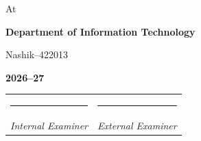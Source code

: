 \begin{center}
\vspace{0.10in}

{\large At\par}

\vspace{0.06in}

{\large\bfseries
Department of Information Technology\par
}

\vspace{0.02in}

{\Large\bfseries
\college\par
}

\vspace{0.02in}

{\large
Nashik--422013\par
}

\vspace{0.04in}

{\large\bfseries
2026--27\par
}

\vspace{0.40in}

\noindent
\begin{tabularx}{\textwidth}{
    >{\centering\arraybackslash}X
    >{\centering\arraybackslash}X
}

\rule{2.2in}{0.4pt} &
\rule{2.2in}{0.4pt}
\\[4pt]

\large\itshape Internal Examiner &
\large\itshape External Examiner

\end{tabularx}

\end{center}

\clearpage
